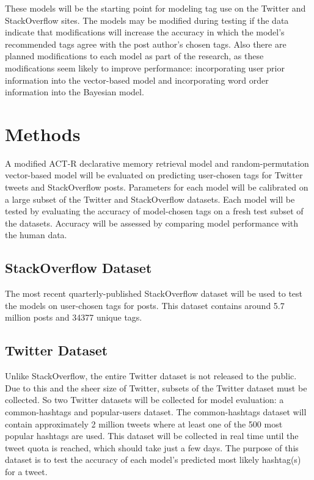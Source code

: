 \documentclass[man,floatsintext,donotrepeattitle]{apa6}
\begin{document}
These models will be the starting point for modeling tag use on the Twitter and StackOverflow sites.
The models may be modified during testing if the data indicate that modifications will increase the accuracy in which the model's recommended tags agree with the post author's chosen tags.
Also there are planned modifications to each model as part of the research, as these modifications seem likely to improve performance: 
incorporating user prior information into the vector-based model and incorporating word order information into the Bayesian model.

\section{Methods}

A modified ACT-R declarative memory retrieval model and random-permutation vector-based model will be evaluated on predicting user-chosen tags for Twitter tweets and StackOverflow posts.
Parameters for each model will be calibrated on a large subset of the Twitter and StackOverflow datasets.
Each model will be tested by evaluating the accuracy of model-chosen tags on a fresh test subset of the datasets.
Accuracy will be assessed by comparing model performance with the human data.

\subsection{StackOverflow Dataset}

The most recent quarterly-published StackOverflow dataset \parencite{DataDump2013} will be used to test the models on user-chosen tags for posts.
This dataset contains around \num{5.7} million posts and \num{34377} unique tags.

\subsection{Twitter Dataset}

Unlike StackOverflow, the entire Twitter dataset is not released to the public.
Due to this and the sheer size of Twitter, subsets of the Twitter dataset must be collected.
So two Twitter datasets will be collected for model evaluation: a common-hashtags and popular-users dataset.
The common-hashtags dataset will contain approximately 2 million tweets where at least one of the 500 most popular hashtags are used.
This dataset will be collected in real time until the tweet quota is reached, which should take just a few days.
The purpose of this dataset is to test the accuracy of each model's predicted most likely hashtag(s) for a tweet.
\end{document}
